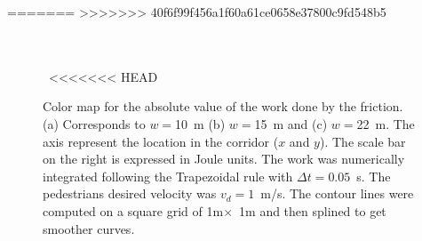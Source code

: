 =======
>>>>>>> 40f6f99f456a1f60a61ce0658e37800c9fd548b5
\begin{figure}[!htbp]
    \\ 
    \\
    \
<<<<<<< HEAD
\caption[width=0.47\columnwidth] {Color map for the absolute value of the work done by the friction. (a) Corresponds to $w=$10~m (b) $w=$15~m and (c) $w=$22~m. The axis represent the location in the corridor ($x$ and $y$). The scale bar on the right is expressed in Joule units. The work was numerically integrated following the Trapezoidal rule with $\Delta t =0.05$~s. The pedestrians desired velocity was $v_d = 1$~m/s. The contour lines were computed on a square grid of 1m$\times$~1m and then splined to get smoother curves.} 

\end{figure}
